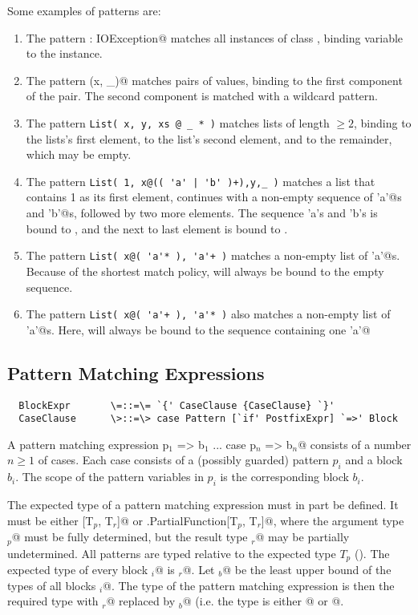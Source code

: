 \documentclass[11pt]{report}
\begin{document}
\example Some examples of patterns are:
\begin{enumerate}
\item
The pattern \verb@ex: IOException@ matches all instances of class
\verb@IOException@, binding variable \verb@ex@ to the instance.
\item
The pattern \verb@Pair(x, _)@ matches pairs of values, binding \verb@x@ to
the first component of the pair. The second component is matched
with a wildcard pattern.
\item
The pattern \verb+List( x, y, xs @ _ * )+ matches lists of length $\geq 2$,
binding \verb@x@ to the lists's first element, \verb@y@ to the list's
second element, and \verb@xs@ to the remainder, which may be empty.
\item
The pattern \verb=List( 1, x@(( 'a' | 'b' )+),y,_ )= matches a list that
contains 1 as its first element, continues with a non-empty sequence of 
\verb@'a'@s and \verb@'b'@s, followed by two more elements. The sequence 'a's and 'b's
is bound to \verb@x@, and the next to last element is bound to \verb@y@.
\item
The pattern \verb=List( x@( 'a'* ), 'a'+ )= matches a non-empty list of
\verb@'a'@s. Because of the shortest match policy, \verb@x@ will always be bound to
the empty sequence.
\item
The pattern \verb=List( x@( 'a'+ ), 'a'* )= also matches a non-empty list of
\verb@'a'@s. Here, \verb@x@ will always be bound to
the sequence containing one \verb@'a'@
\end{enumerate}

\subsection{Pattern Matching Expressions}
\label{sec:pattern-match}

\syntax\begin{verbatim}
  BlockExpr       \=::=\= `{' CaseClause {CaseClause} `}'
  CaseClause      \>::=\> case Pattern [`if' PostfixExpr] `=>' Block 
\end{verbatim}

A pattern matching expression
\verb@case p$_1$ => b$_1$ ... case p$_n$ => b$_n$@ consists of a number 
$n \geq 1$ of cases. Each case consists of a (possibly guarded) pattern 
$p_i$ and a block $b_i$.  The scope of the pattern variables in $p_i$ is 
the corresponding block $b_i$.

The expected type of a pattern matching expression must in part be
defined. It must be either [T$_p$, T$_r$]@ or
\verb@scala.PartialFunction[T$_p$, T$_r$]@, where the argument type
\verb@T$_p$@ must be fully determined, but the result type
\verb@T$_r$@ may be partially undetermined.  All patterns are typed
relative to the expected type $T_p$ ().  The expected type of
every block \verb@b$_i$@ is \verb@T$_r$@.
Let \verb@T$_b$@ be the least upper bound of the types of all blocks 
\verb@b$_i$@. The type of the pattern matching expression is
then the required type with \verb@T$_r$@ replaced by \verb@T$_b$@
(i.e. the type is either \verb@Function[T$_p$, T$_b$]@ or
\verb@PartialFunction[T$_p$, T$_b$]@.
\end{document}

